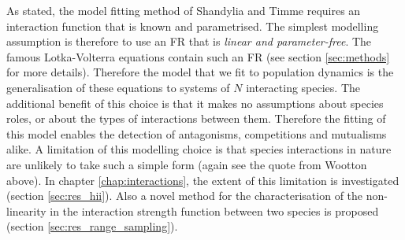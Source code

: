 As stated, the model fitting method of Shandylia and Timme \cite{shandilya2011inferring} requires an interaction function that is known and parametrised. The simplest modelling assumption is therefore to use an FR that is \emph{linear and parameter-free}. The famous Lotka-Volterra equations \cite{lotka1925elements,volterra1926} contain such an FR (see section \ref{sec:methods} for more details). Therefore the model that we fit to population dynamics is the generalisation of these equations to systems of $N$ interacting species. The additional benefit of this choice is that it makes no assumptions about species roles, or about the types of interactions between them. Therefore the fitting of this model enables the detection of antagonisms, competitions and mutualisms alike. A limitation of this modelling choice is that species interactions in nature are unlikely to take such a simple form (again see the quote from Wootton above). In chapter \ref{chap:interactions}, the extent of this limitation is investigated (section \ref{sec:res_hii}). Also a novel method for the characterisation of the non-linearity in the interaction strength function between two species is proposed (section \ref{sec:res_range_sampling}).







%
%


